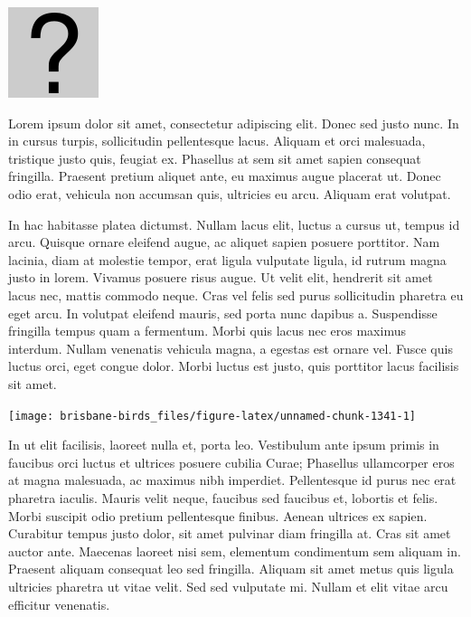 \documentclass[]{book}
\let\origfigure\figure
\let\endorigfigure\endfigure
\renewenvironment{figure}[1][2] {
  \expandafter\origfigure\expandafter[H]
} {
  \endorigfigure
}
\begin{document}
\begin{figure}
\centering
\includegraphics{assets/missing.png}
\caption{No image for species}
\end{figure}

Lorem ipsum dolor sit amet, consectetur adipiscing elit. Donec sed justo
nunc. In in cursus turpis, sollicitudin pellentesque lacus. Aliquam et
orci malesuada, tristique justo quis, feugiat ex. Phasellus at sem sit
amet sapien consequat fringilla. Praesent pretium aliquet ante, eu
maximus augue placerat ut. Donec odio erat, vehicula non accumsan quis,
ultricies eu arcu. Aliquam erat volutpat.

In hac habitasse platea dictumst. Nullam lacus elit, luctus a cursus ut,
tempus id arcu. Quisque ornare eleifend augue, ac aliquet sapien posuere
porttitor. Nam lacinia, diam at molestie tempor, erat ligula vulputate
ligula, id rutrum magna justo in lorem. Vivamus posuere risus augue. Ut
velit elit, hendrerit sit amet lacus nec, mattis commodo neque. Cras vel
felis sed purus sollicitudin pharetra eu eget arcu. In volutpat eleifend
mauris, sed porta nunc dapibus a. Suspendisse fringilla tempus quam a
fermentum. Morbi quis lacus nec eros maximus interdum. Nullam venenatis
vehicula magna, a egestas est ornare vel. Fusce quis luctus orci, eget
congue dolor. Morbi luctus est justo, quis porttitor lacus facilisis sit
amet.

\begin{figure}
\texttt{[image: brisbane-birds\_files/figure-latex/unnamed-chunk-1341-1]} \caption{insert figure caption}\label{fig:unnamed-chunk-1341}
\end{figure}

In ut elit facilisis, laoreet nulla et, porta leo. Vestibulum ante ipsum
primis in faucibus orci luctus et ultrices posuere cubilia Curae;
Phasellus ullamcorper eros at magna malesuada, ac maximus nibh
imperdiet. Pellentesque id purus nec erat pharetra iaculis. Mauris velit
neque, faucibus sed faucibus et, lobortis et felis. Morbi suscipit odio
pretium pellentesque finibus. Aenean ultrices ex sapien. Curabitur
tempus justo dolor, sit amet pulvinar diam fringilla at. Cras sit amet
auctor ante. Maecenas laoreet nisi sem, elementum condimentum sem
aliquam in. Praesent aliquam consequat leo sed fringilla. Aliquam sit
amet metus quis ligula ultricies pharetra ut vitae velit. Sed sed
vulputate mi. Nullam et elit vitae arcu efficitur venenatis.
\end{document}
